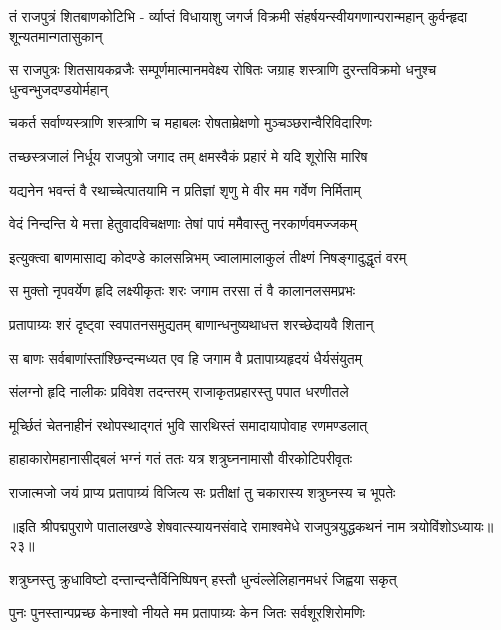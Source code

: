 \fourlineindentedshloka
{तं राजपुत्रं शितबाणकोटिभि -}
{र्व्याप्तं विधायाशु जगर्ज विक्रमी}
{संहर्षयन्स्वीयगणान्परान्महान्}
{कुर्वन्हृदा शून्यतमान्गतासुकान्}%

\fourlineindentedshloka
{स राजपुत्रः शितसायकव्रजैः}
{सम्पूर्णमात्मानमवेक्ष्य रोषितः}
{जग्राह शस्त्राणि दुरन्तविक्रमो}
{धनुश्च धुन्वन्भुजदण्डयोर्महान्}%

\twolineshloka
{चकर्त सर्वाण्यस्त्राणि शस्त्राणि च महाबलः}
{रोषताम्रेक्षणो मुञ्चञ्छरान्वैरिविदारिणः}%

\twolineshloka
{तच्छस्त्रजालं निर्धूय राजपुत्रो जगाद तम्}
{क्षमस्वैकं प्रहारं मे यदि शूरोसि मारिष}%

\twolineshloka
{यद्यनेन भवन्तं वै रथाच्चेत्पातयामि न}
{प्रतिज्ञां शृणु मे वीर मम गर्वेण निर्मिताम्}%

\twolineshloka
{वेदं निन्दन्ति ये मत्ता हेतुवादविचक्षणाः}
{तेषां पापं ममैवास्तु नरकार्णवमज्जकम्}%

\twolineshloka
{इत्युक्त्वा बाणमासाद्य कोदण्डे कालसन्निभम्}
{ज्वालामालाकुलं तीक्ष्णं निषङ्गादुद्धृतं वरम्}%

\twolineshloka
{स मुक्तो नृपवर्येण हृदि लक्ष्यीकृतः शरः}
{जगाम तरसा तं वै कालानलसमप्रभः}%

\twolineshloka
{प्रतापाग्र्यः शरं दृष्ट्वा स्वपातनसमुद्यतम्}
{बाणान्धनुष्यथाधत्त शरच्छेदायवै शितान्}%

\twolineshloka
{स बाणः सर्वबाणांस्तांश्छिन्दन्मध्यत एव हि}
{जगाम वै प्रतापाग्र्यहृदयं धैर्यसंयुतम्}%

\twolineshloka
{संलग्नो हृदि नालीकः प्रविवेश तदन्तरम्}
{राजाकृतप्रहारस्तु पपात धरणीतले}%

\twolineshloka
{मूर्च्छितं चेतनाहीनं रथोपस्थाद्गतं भुवि}
{सारथिस्तं समादायापोवाह रणमण्डलात्}%

\twolineshloka
{हाहाकारोमहानासीद्बलं भग्नं गतं ततः}
{यत्र शत्रुघ्ननामासौ वीरकोटिपरीवृतः}%

\twolineshloka
{राजात्मजो जयं प्राप्य प्रतापाग्र्यं विजित्य सः}
{प्रतीक्षां तु चकारास्य शत्रुघ्नस्य च भूपतेः}%

{॥इति श्रीपद्मपुराणे पातालखण्डे शेषवात्स्यायनसंवादे रामाश्वमेधे राजपुत्रयुद्धकथनं नाम त्रयोविंशोऽध्यायः॥२३॥}



\twolineshloka
{शत्रुघ्नस्तु क्रुधाविष्टो दन्तान्दन्तैर्विनिष्पिषन्}
{हस्तौ धुन्वंल्लेलिहानमधरं जिह्वया सकृत्}%

\twolineshloka
{पुनः पुनस्तान्पप्रच्छ केनाश्वो नीयते मम}
{प्रतापाग्र्यः केन जितः सर्वशूरशिरोमणिः}%

